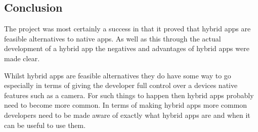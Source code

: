 \subsection{Conclusion}
The project was most certainly a success in that it proved that hybrid apps are feasible alternatives to native apps. As well as this through the actual development of a hybrid app the negatives and advantages of hybrid apps were made clear.

Whilst hybrid apps are feasible alternatives they do have some way to go especially in terms of giving the developer full control over a devices native features such as a camera. For such things to happen then hybrid apps probably need to become more common. In terms of making hybrid apps more common developers need to be made aware of exactly what hybrid apps are and when it can be useful to use them. 
